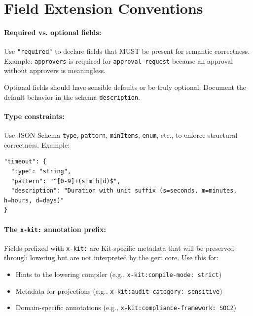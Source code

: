 \section{Field Extension Conventions}
\label{sec:field-conventions}

\paragraph{Required vs. optional fields:}

Use \texttt{"required"} to declare fields that MUST be present for semantic
correctness. Example: \texttt{approvers} is required for
\texttt{approval-request} because an approval without approvers is meaningless.

Optional fields should have sensible defaults or be truly optional. Document
the default behavior in the schema \texttt{description}.

\paragraph{Type constraints:}

Use JSON Schema \texttt{type}, \texttt{pattern}, \texttt{minItems},
\texttt{enum}, etc., to enforce structural correctness. Example:

\begin{verbatim}
"timeout": {
  "type": "string",
  "pattern": "^[0-9]+(s|m|h|d)$",
  "description": "Duration with unit suffix (s=seconds, m=minutes, h=hours, d=days)"
}
\end{verbatim}

\paragraph{The \texttt{x-kit:} annotation prefix:}

Fields prefixed with \texttt{x-kit:} are Kit-specific metadata that will be
preserved through lowering but are not interpreted by the gert core. Use this
for:

\begin{itemize}
  \item Hints to the lowering compiler (e.g., \texttt{x-kit:compile-mode: strict})
  \item Metadata for projections (e.g., \texttt{x-kit:audit-category: sensitive})
  \item Domain-specific annotations (e.g., \texttt{x-kit:compliance-framework: SOC2})
\end{itemize}

